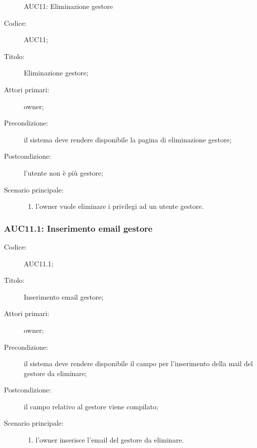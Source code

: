 \documentclass[../../../analisi-dei-requisiti.tex]{subfiles}
\begin{document}
\begin{figure}[H]
  \centering
  \caption{AUC11: Eliminazione gestore}%
  \label{fig:AUC11}
\end{figure}

\begin{description}
  \item[Codice:] AUC11;
  \item[Titolo:] Eliminazione gestore;
  \item[Attori primari:] owner;
  \item[Precondizione:] il sistema deve rendere disponibile la pagina di eliminazione gestore;
  \item[Postcondizione:] l'utente non è più gestore;
  \item[Scenario principale:]
  \begin{enumerate}
    \item l'owner vuole eliminare i privilegi ad un utente gestore.
  \end{enumerate}
\end{description}

\subsubsection{AUC11.1: Inserimento email gestore}%
\label{subs:AUC11.1}
\begin{description}
  \item[Codice:] AUC11.1;
  \item[Titolo:] Inserimento email gestore;
  \item[Attori primari:] owner;
  \item[Precondizione:] il sistema deve rendere disponibile il campo per l'inserimento della mail del gestore da eliminare;
  \item[Postcondizione:] il campo relativo al gestore viene compilato;
  \item[Scenario principale:]
  \begin{enumerate}
    \item l'owner inserisce l'email del gestore da eliminare.
  \end{enumerate}
\end{description}
\end{document}
